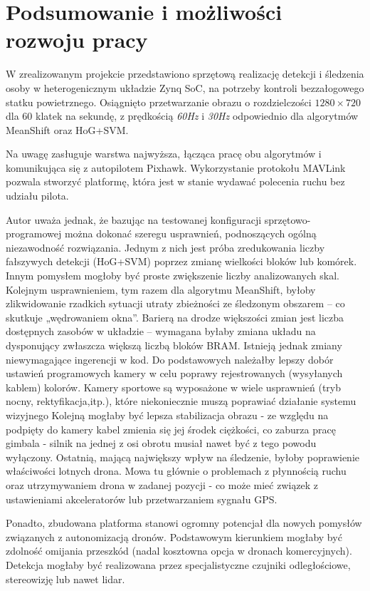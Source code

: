 \chapter{Podsumowanie i możliwości rozwoju pracy}

W zrealizowanym projekcie przedstawiono sprzętową realizację detekcji i śledzenia osoby w heterogenicznym układzie Zynq SoC, na potrzeby kontroli bezzałogowego statku powietrznego. 
Osiągnięto przetwarzanie obrazu o rozdzielczości $1280\times 720$ dla 60 klatek na sekundę, z prędkością \textit{60Hz} i \textit{30Hz} odpowiednio dla algorytmów MeanShift oraz HoG+SVM.

Na uwagę zasługuje warstwa najwyższa, łącząca pracę obu algorytmów i komunikująca się z autopilotem Pixhawk. 
Wykorzystanie protokołu MAVLink pozwala stworzyć platformę, która jest w stanie wydawać polecenia ruchu bez udziału pilota.


Autor uważa jednak, że bazując na testowanej konfiguracji sprzętowo-programowej można dokonać szeregu usprawnień, podnoszących ogólną niezawodność rozwiązania. %
Jednym z nich jest próba zredukowania liczby fałszywych detekcji (HoG+SVM) poprzez zmianę wielkości bloków lub komórek. %
Innym pomysłem mogłoby być proste zwiększenie liczby analizowanych skal. %
Kolejnym usprawnieniem, tym razem dla algorytmu MeanShift, byłoby zlikwidowanie rzadkich sytuacji utraty zbieżności ze śledzonym obszarem -- co skutkuje „wędrowaniem okna”. %
Barierą na drodze większości zmian jest liczba dostępnych zasobów w układzie -- wymagana byłaby zmiana układu na dysponujący zwłaszcza większą liczbą bloków BRAM. 
Istnieją jednak zmiany niewymagające ingerencji w kod. 
Do podstawowych należałby lepszy dobór ustawień programowych kamery w celu poprawy rejestrowanych (wysyłanych kablem) kolorów. Kamery sportowe są wyposażone w wiele usprawnień (tryb nocny, rektyfikacja,itp.), które niekoniecznie muszą poprawiać działanie systemu wizyjnego %
Kolejną mogłaby być lepsza stabilizacja obrazu - ze względu na podpięty do kamery kabel zmienia się jej środek ciężkości, co zaburza pracę gimbala - silnik na jednej z osi obrotu musiał nawet być z tego powodu wyłączony. %
Ostatnią, mającą największy wpływ na śledzenie, byłoby poprawienie właściwości lotnych drona. Mowa tu głównie o problemach z płynnością ruchu oraz utrzymywaniem drona w zadanej pozycji - co może mieć związek z ustawieniami akceleratorów lub przetwarzaniem sygnału GPS.%

Ponadto, zbudowana platforma stanowi ogromny potencjał dla nowych pomysłów związanych z autonomizacją dronów. 
Podstawowym kierunkiem mogłaby być zdolność omijania przeszkód (nadal kosztowna opcja w dronach komercyjnych). Detekcja mogłaby być realizowana przez specjalistyczne czujniki odległościowe, stereowizję lub nawet lidar. %



